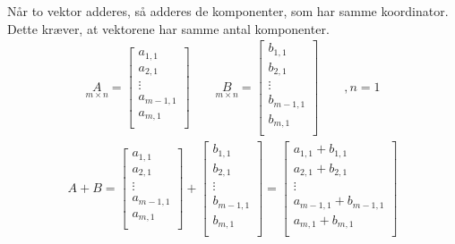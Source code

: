 \begin{defn}
Når to vektor adderes, så adderes de komponenter, som har samme koordinator. Dette kræver, at vektorene har samme antal komponenter.
\begin{align*}
\underset{m \times n}{A} = 
\begin{bmatrix}
a_{1,1}\\
a_{2,1}\\
\vdots \\
a_{m-1,1}\\
a_{m,1} \\
\end{bmatrix}
\qquad
\underset{m \times n}{B} = 
\begin{bmatrix}
b_{1,1}\\
b_{2,1}\\
\vdots \\
b_{m-1,1}\\
b_{m,1} \\
\end{bmatrix}
\qquad , n=1
\end{align*} 
\begin{align*}
A+B=
\begin{bmatrix}
a_{1,1}\\
a_{2,1}\\
\vdots \\
a_{m-1,1}\\
a_{m,1} \\
\end{bmatrix}
+
\begin{bmatrix}
b_{1,1}\\
b_{2,1}\\
\vdots \\
b_{m-1,1}\\
b_{m,1} \\
\end{bmatrix}
=
\begin{bmatrix}
a_{1,1}+b_{1,1}\\
a_{2,1}+b_{2,1}\\
\vdots \\
a_{m-1,1}+b_{m-1,1}\\
a_{m,1}+b_{m,1} \\
\end{bmatrix}
\end{align*}
\end{defn}

